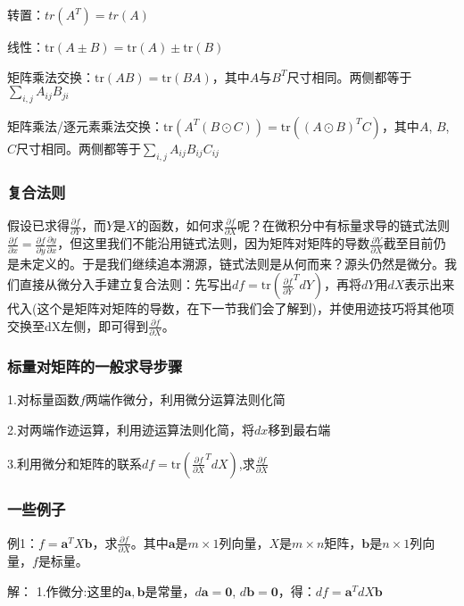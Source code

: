 \documentclass[UTF8]{ctexart}
\begin{document}
		转置：${tr}(A^T) = {tr}(A)$

		线性：$\text{tr}(A\pm B) = \text{tr}(A)\pm \text{tr}(B)$

		矩阵乘法交换：$\text{tr}(AB) = \text{tr}(BA)$，其中$A$与$B^T$尺寸相同。两侧都等于$\sum_{i,j}A_{ij}B_{ji}$

		矩阵乘法/逐元素乘法交换：$\text{tr}(A^T(B\odot C)) = \text{tr}((A\odot B)^TC)$，其中$A$, $B$, $C$尺寸相同。两侧都等于$\sum_{i,j}A_{ij}B_{ij}C_{ij}$

		\subsubsection*{复合法则}
		假设已求得$\frac{\partial f}{\partial Y}$，而$Y$是$X$的函数，如何求$\frac{\partial f}{\partial X}$呢？在微积分中有标量求导的链式法则$\frac{\partial f}{\partial x} = \frac{\partial f}{\partial y} \frac{\partial y}{\partial x}$，但这里我们不能沿用链式法则，因为矩阵对矩阵的导数$\frac{\partial Y}{\partial X}$截至目前仍是未定义的。于是我们继续追本溯源，链式法则是从何而来？源头仍然是微分。我们直接从微分入手建立复合法则：先写出$df = \text{tr}\left(\frac{\partial f}{\partial Y}^T dY\right)$，再将$dY$用$dX$表示出来代入(这个是矩阵对矩阵的导数，在下一节我们会了解到)，并使用迹技巧将其他项交换至dX左侧，即可得到$\frac{\partial f}{\partial X}$。

		\subsubsection*{标量对矩阵的一般求导步骤}
		{\color{red}

		1.对标量函数$f$两端作微分，利用微分运算法则化简

		2.对两端作迹运算，利用迹运算法则化简，将$dx$移到最右端

		3.利用微分和矩阵的联系$df = \text{tr}\left(\frac{\partial f}{\partial X}^T dX\right)$,求$\frac{\partial f}{\partial X}$}

		\subsubsection*{一些例子}
		\noindent 例1：$f = \boldsymbol{a}^T X\boldsymbol{b}$，求$\frac{\partial f}{\partial X}$。其中$\boldsymbol{a}$是$m×1$列向量，$X$是$m\times n$矩阵，$\boldsymbol{b}$是$n×1$列向量，$f$是标量。

		\noindent 解：
		1.作微分:这里的$\boldsymbol{a}, \boldsymbol{b}$是常量，$d\boldsymbol{a} = \boldsymbol{0}$, $d\boldsymbol{b} = \boldsymbol{0}$，得：$df = \boldsymbol{a}^T dX\boldsymbol{b}$ 
\end{document}

